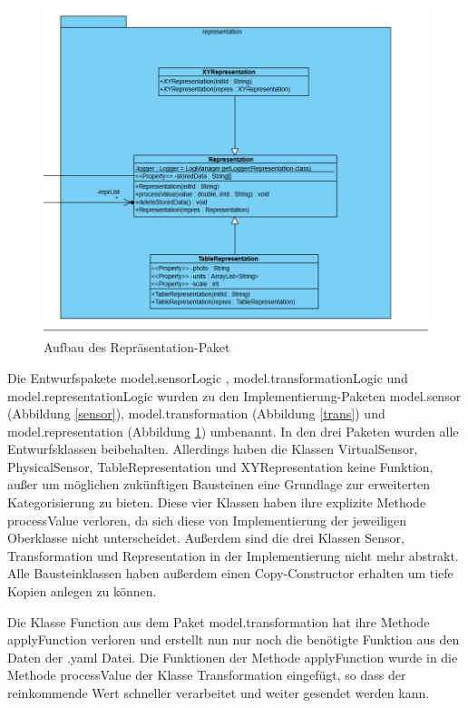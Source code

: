 \documentclass[parskip=full]{scrartcl}
\begin{document}
\begin{figure}[htbp]
	\begin{center}
		\includegraphics[width = 16cm]{Grafiken/repres.PNG}
		\caption{Aufbau des Repräsentation-Paket}
		\label{repres}
	\end{center}
\end{figure}

Die Entwurfspakete model.sensorLogic , model.transformationLogic und model.representationLogic wurden zu den Implementierung-Paketen model.sensor (Abbildung \ref{sensor}), model.transformation (Abbildung \ref{trans}) und model.representation (Abbildung \ref{repres}) umbenannt. In den drei Paketen wurden alle Entwurfsklassen beibehalten. Allerdings haben die Klassen VirtualSensor, PhysicalSensor, TableRepresentation und XYRepresentation keine Funktion, außer um möglichen zukünftigen Bausteinen eine Grundlage zur erweiterten Kategorisierung zu bieten. Diese vier Klassen haben ihre explizite Methode processValue verloren, da sich diese von Implementierung der jeweiligen Oberklasse nicht unterscheidet. Außerdem sind die drei Klassen Sensor, Transformation und Representation in der Implementierung nicht mehr abstrakt. Alle Bausteinklassen haben außerdem einen Copy-Constructor erhalten um tiefe Kopien anlegen zu können.

Die Klasse Function aus dem Paket model.transformation hat ihre Methode applyFunction verloren und erstellt nun nur noch die benötigte Funktion aus den Daten der .yaml Datei. Die Funktionen der Methode applyFunction wurde in die Methode processValue der Klasse Transformation eingefügt, so dass der reinkommende Wert schneller verarbeitet und weiter gesendet werden kann.
\end{document}
